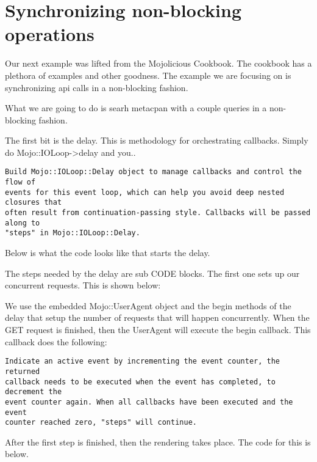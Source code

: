 \documentclass[14pt]{extreport}
\newcommand\Small{\fontsize{12}{13.0}\fontencoding{T1}\selectfont}
\newcommand*\LSTfont{\Small\ttfamily\SetTracking{encoding=*}{-60}\lsstyle}
\begin{document}
\section{Synchronizing non-blocking operations}

Our next example was lifted from the Mojolicious Cookbook.  The cookbook has a
plethora of examples and other goodness.  The example we are focusing on is
synchronizing api calls in a non-blocking fashion.

What we are going to do is searh metacpan with a couple queries in a
non-blocking fashion.

The first bit is the delay.  This is methodology for orchestrating callbacks.  Simply do
Mojo::IOLoop->delay and you..

\begin{lstlisting}[style=BlockStyle]
Build Mojo::IOLoop::Delay object to manage callbacks and control the flow of
events for this event loop, which can help you avoid deep nested closures that
often result from continuation-passing style. Callbacks will be passed along to
"steps" in Mojo::IOLoop::Delay.
\end{lstlisting}

Below is what the code looks like that starts the delay.



The steps needed by the delay are sub CODE blocks.  The first one sets up our
concurrent requests.  This is shown below:



We use the embedded Mojo::UserAgent object and the begin methods of the delay
that setup the number of requests that will happen concurrently.  When the GET
request is finished, then the UserAgent will execute the begin callback.  This
callback does the following:

\begin{lstlisting}[style=BlockStyle]
Indicate an active event by incrementing the event counter, the returned
callback needs to be executed when the event has completed, to decrement the
event counter again. When all callbacks have been executed and the event
counter reached zero, "steps" will continue.
\end{lstlisting}

After the first step is finished, then the rendering takes place.  The code for
this is below.
\end{document}
